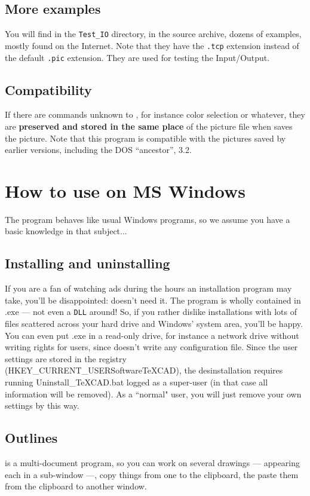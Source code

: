 \documentclass[11pt,a4paper]{article}
\begin{document}
\subsection{More examples}
You will find in the {\tt Test\_IO} directory, in the source archive,
dozens of examples, mostly found on the Internet. Note that they
have the {\tt .tcp} extension instead of the default {\tt .pic} extension.
They are used for testing the {\TC} Input/Output.
%
\subsection{Compatibility} If there are commands unknown to {\TC},
for instance color selection or whatever,
they are {\bf preserved and stored in the same place} of the
picture file when {\TC} saves the picture.
Note that this program is compatible with the pictures saved by earlier
versions, including the DOS ``ancestor'', {\TC} 3.2.
%
\section{How to use {{\TC}} on MS Windows}
%
The program behaves like usual Windows programs, so we assume
you have a basic knowledge in that subject...
%
\subsection{Installing and uninstalling}
If you are a fan of watching ads during the hours an installation
program may take, you'll be disappointed: {\TC} doesn't need it.
The program is wholly contained in {\TC}.exe --- not even a {\tt DLL} around!
So, if you rather dislike installations with lots of files scattered across
your hard drive and Windows' system area, you'll be happy.
You can even put {\TC}.exe in a read-only drive, for instance a network
drive without writing rights for users, since {\TC} doesn't write
any configuration file. Since the user settings are stored
in the registry (HKEY\_CURRENT\_USER\bs Software\bs TeXCAD), the
desinstallation requires running Uninstall\_TeXCAD.bat
logged as a super-user (in that case all {\TC} information will be removed).
As a ``normal" user, you will just remove your own settings by this way.
%
\subsection{Outlines}
{\TC} is a multi-document program, so you can work on several
drawings --- appearing each in a sub-window ---, copy things from
one to the clipboard, the paste them from the clipboard to another
window.
\end{document}
